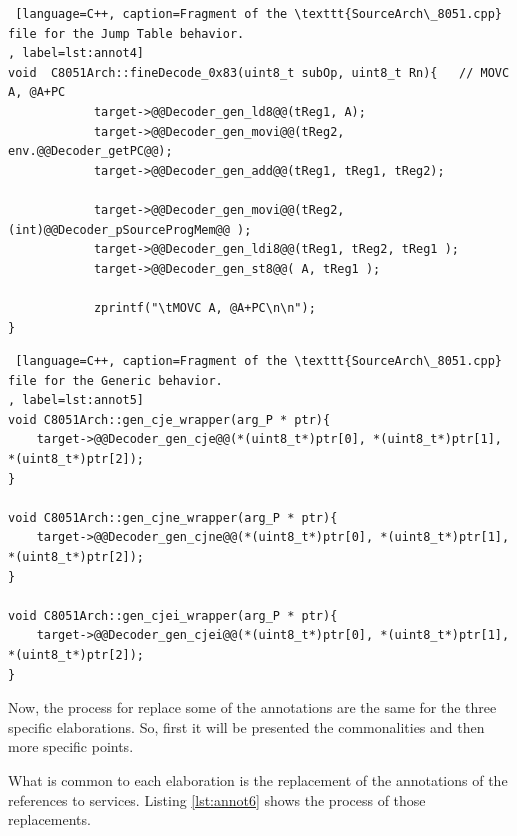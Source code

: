 \begin{lstlisting} [language=C++, caption=Fragment of the \texttt{SourceArch\_8051.cpp} file for the Jump Table behavior.
, label=lst:annot4]
void  C8051Arch::fineDecode_0x83(uint8_t subOp, uint8_t Rn){   // MOVC A, @A+PC
			target->@@Decoder_gen_ld8@@(tReg1, A);
			target->@@Decoder_gen_movi@@(tReg2, env.@@Decoder_getPC@@);
			target->@@Decoder_gen_add@@(tReg1, tReg1, tReg2);
		
			target->@@Decoder_gen_movi@@(tReg2, (int)@@Decoder_pSourceProgMem@@ );
			target->@@Decoder_gen_ldi8@@(tReg1, tReg2, tReg1 );
			target->@@Decoder_gen_st8@@( A, tReg1 );

			zprintf("\tMOVC A, @A+PC\n\n");
}
\end{lstlisting}

\begin{lstlisting} [language=C++, caption=Fragment of the \texttt{SourceArch\_8051.cpp} file for the Generic behavior.
, label=lst:annot5]
void C8051Arch::gen_cje_wrapper(arg_P * ptr){ 
    target->@@Decoder_gen_cje@@(*(uint8_t*)ptr[0], *(uint8_t*)ptr[1], *(uint8_t*)ptr[2]);    
}

void C8051Arch::gen_cjne_wrapper(arg_P * ptr){ 
    target->@@Decoder_gen_cjne@@(*(uint8_t*)ptr[0], *(uint8_t*)ptr[1], *(uint8_t*)ptr[2]);      
}

void C8051Arch::gen_cjei_wrapper(arg_P * ptr){
    target->@@Decoder_gen_cjei@@(*(uint8_t*)ptr[0], *(uint8_t*)ptr[1], *(uint8_t*)ptr[2]);    
}
\end{lstlisting}

Now, the process for replace some of the annotations are the same for the three specific elaborations. So, first it will be presented the commonalities and then more specific points. 

What is common to each elaboration is the replacement of the annotations of the references to services. Listing \ref{lst:annot6} shows the process of those replacements.

